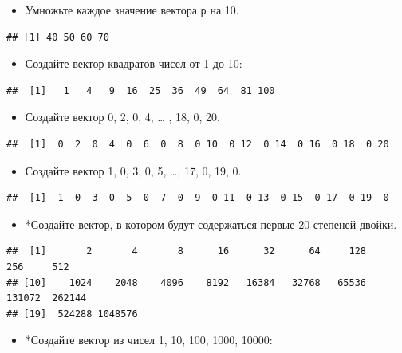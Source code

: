 \documentclass[]{book}
\providecommand{\tightlist}{%
  \setlength{\itemsep}{0pt}\setlength{\parskip}{0pt}}
\begin{document}
\begin{itemize}
\tightlist
\item
  Умножьте каждое значение вектора \texttt{p} на 10.
\end{itemize}

\begin{verbatim}
## [1] 40 50 60 70
\end{verbatim}

\begin{itemize}
\tightlist
\item
  Создайте вектор квадратов чисел от 1 до 10:
\end{itemize}

\begin{verbatim}
##  [1]   1   4   9  16  25  36  49  64  81 100
\end{verbatim}

\begin{itemize}
\tightlist
\item
  Создайте вектор 0, 2, 0, 4, \ldots{} , 18, 0, 20.
\end{itemize}

\begin{verbatim}
##  [1]  0  2  0  4  0  6  0  8  0 10  0 12  0 14  0 16  0 18  0 20
\end{verbatim}

\begin{itemize}
\tightlist
\item
  Создайте вектор 1, 0, 3, 0, 5, \ldots{}, 17, 0, 19, 0.
\end{itemize}

\begin{verbatim}
##  [1]  1  0  3  0  5  0  7  0  9  0 11  0 13  0 15  0 17  0 19  0
\end{verbatim}

\begin{itemize}
\tightlist
\item
  *Создайте вектор, в котором будут содержаться первые 20 степеней
  двойки.
\end{itemize}

\begin{verbatim}
##  [1]       2       4       8      16      32      64     128     256     512
## [10]    1024    2048    4096    8192   16384   32768   65536  131072  262144
## [19]  524288 1048576
\end{verbatim}

\begin{itemize}
\tightlist
\item
  *Создайте вектор из чисел 1, 10, 100, 1000, 10000:
\end{itemize}
\end{document}
